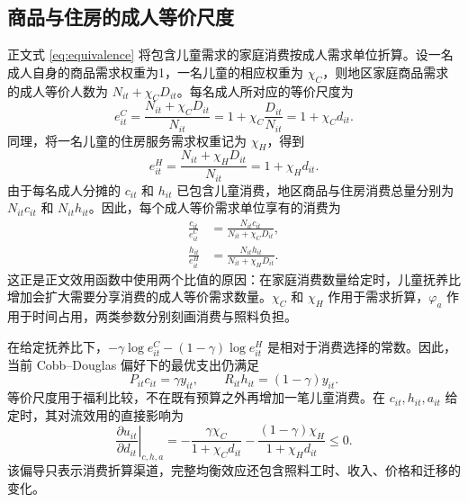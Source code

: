 \documentclass[UTF8,a4paper,zihao=-4,fontset=windows]{ctexart}
\numberwithin{equation}{section}
\begin{document}
\subsection{商品与住房的成人等价尺度}
\label{app:equivalence}

正文式 \eqref{eq:equivalence} 将包含儿童需求的家庭消费按成人需求单位折算。设一名成人自身的商品需求权重为1，一名儿童的相应权重为 $\chi_C$，则地区家庭商品需求的成人等价人数为 $N_{it}+\chi_CD_{it}$。每名成人所对应的等价尺度为
\begin{equation}
  e^C_{it}
  =\frac{N_{it}+\chi_CD_{it}}{N_{it}}
  =1+\chi_C\frac{D_{it}}{N_{it}}
  =1+\chi_Cd_{it}.
  \label{eq:app-goods-equivalence}
\end{equation}
同理，将一名儿童的住房服务需求权重记为 $\chi_H$，得到
\begin{equation}
  e^H_{it}
  =\frac{N_{it}+\chi_HD_{it}}{N_{it}}
  =1+\chi_Hd_{it}.
  \label{eq:app-housing-equivalence}
\end{equation}
由于每名成人分摊的 $c_{it}$ 和 $h_{it}$ 已包含儿童消费，地区商品与住房消费总量分别为 $N_{it}c_{it}$ 和 $N_{it}h_{it}$。因此，每个成人等价需求单位享有的消费为
\begin{align}
  \frac{c_{it}}{e^C_{it}}
    &=\frac{N_{it}c_{it}}{N_{it}+\chi_CD_{it}},
    \label{eq:app-equivalent-goods-consumption}\\
  \frac{h_{it}}{e^H_{it}}
    &=\frac{N_{it}h_{it}}{N_{it}+\chi_HD_{it}}.
    \label{eq:app-equivalent-housing-consumption}
\end{align}
这正是正文效用函数中使用两个比值的原因：在家庭消费数量给定时，儿童抚养比增加会扩大需要分享消费的成人等价需求数量。$\chi_C$ 和 $\chi_H$ 作用于需求折算，$\varphi_a$ 作用于时间占用，两类参数分别刻画消费与照料负担。

在给定抚养比下，$-\gamma\log e^C_{it}-(1-\gamma)\log e^H_{it}$ 是相对于消费选择的常数。因此，当前 Cobb--Douglas 偏好下的最优支出仍满足
\begin{equation}
  P_{it}c_{it}=\gamma y_{it},\qquad
  R_{it}h_{it}=(1-\gamma)y_{it}.
  \label{eq:app-equivalence-budget-shares}
\end{equation}
等价尺度用于福利比较，不在既有预算之外再增加一笔儿童消费。在 $c_{it},h_{it},a_{it}$ 给定时，其对流效用的直接影响为
\begin{equation}
  \left.\frac{\partial u_{it}}{\partial d_{it}}\right|_{c,h,a}
  =-\frac{\gamma\chi_C}{1+\chi_Cd_{it}}
   -\frac{(1-\gamma)\chi_H}{1+\chi_Hd_{it}}\leq0.
  \label{eq:app-dependency-utility}
\end{equation}
该偏导只表示消费折算渠道，完整均衡效应还包含照料工时、收入、价格和迁移的变化。
\end{document}
